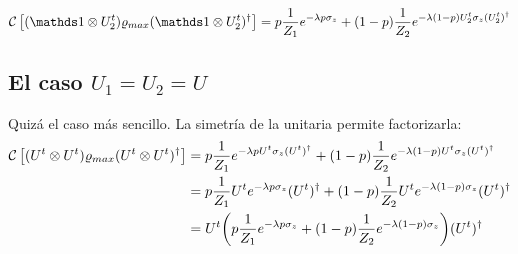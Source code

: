 \begin{equation}\label{eq:SeparableDynamicsIxU}
\CG{(\Id\otimes U_{2}^{t} )\varrho_{max}(\Id\otimes U_{2}^{t})^{\dag}}=p\frac{1}{Z_{1}}e^{-\lambda p \sigma_{z}}+(1-p)\frac{1}{Z_{2}}e^{-\lambda (1-p)U_{2}^{t}\sigma_{z}(U_{2}^t)^{\dag}}
\end{equation}

\subsection{El caso $U_{1}=U_{2}=U$}

Quizá el caso más sencillo. La simetría de la unitaria permite factorizarla:
\begin{align*}
\mathcal{C}\left[(U^{t}\otimes U^{t})\varrho_{max}(U^{t}\otimes U^{t})^{\dag}\right]&=p\frac{1}{Z_{1}}e^{-\lambda p U^{t}\sigma_{z}(U^t)^{\dag}}+(1-p)\frac{1}{Z_{2}}e^{-\lambda (1-p)U^{t}\sigma_{z}(U^t)^{\dag}}\\
&=p\frac{1}{Z_{1}}U^{t}e^{-\lambda p \sigma_{z}}(U^t)^{\dag}+(1-p)\frac{1}{Z_{2}}U^{t}e^{-\lambda (1-p)\sigma_{z}}(U^t)^{\dag}\\
&=U^{t}\qty(p\frac{1}{Z_{1}}e^{-\lambda p \sigma_{z}}+(1-p)\frac{1}{Z_{2}}e^{-\lambda (1-p)\sigma_{z}})(U^t)^{\dag}\\
\end{align*}
\newpage